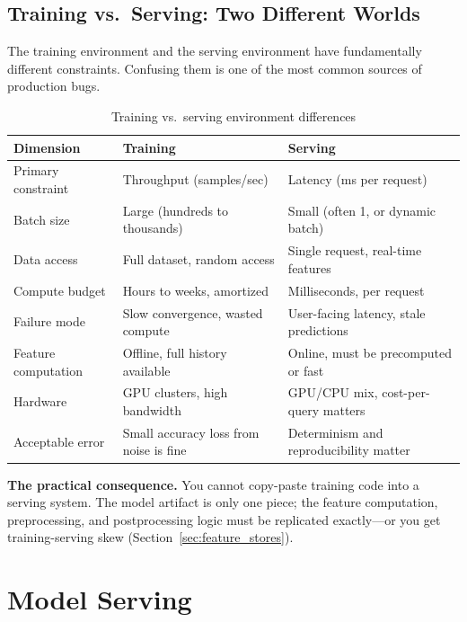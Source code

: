 \subsection{Training vs.\ Serving: Two Different Worlds}

The training environment and the serving environment have fundamentally different constraints. Confusing them is one of the most common sources of production bugs.

\begin{table}[H]
\centering
\caption{Training vs.\ serving environment differences}
\begin{tabularx}{\textwidth}{lXX}
\toprule
\textbf{Dimension} & \textbf{Training} & \textbf{Serving} \\
\midrule
Primary constraint & Throughput (samples/sec) & Latency (ms per request) \\
Batch size & Large (hundreds to thousands) & Small (often 1, or dynamic batch) \\
Data access & Full dataset, random access & Single request, real-time features \\
Compute budget & Hours to weeks, amortized & Milliseconds, per request \\
Failure mode & Slow convergence, wasted compute & User-facing latency, stale predictions \\
Feature computation & Offline, full history available & Online, must be precomputed or fast \\
Hardware & GPU clusters, high bandwidth & GPU/CPU mix, cost-per-query matters \\
Acceptable error & Small accuracy loss from noise is fine & Determinism and reproducibility matter \\
\bottomrule
\end{tabularx}
\end{table}

\textbf{The practical consequence.} You cannot copy-paste training code into a serving system. The model artifact is only one piece; the feature computation, preprocessing, and postprocessing logic must be replicated exactly---or you get training-serving skew (Section~\ref{sec:feature_stores}).

\section{Model Serving}
\label{sec:model_serving}

